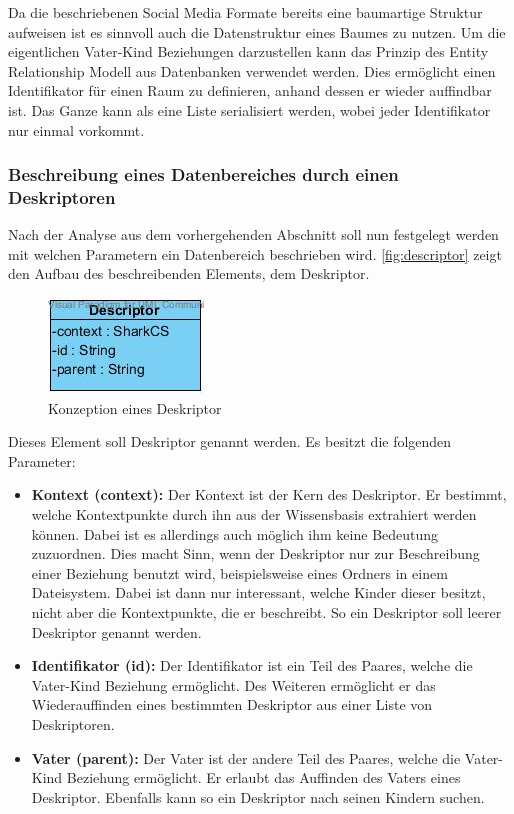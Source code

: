 \documentclass[a4paper]{article}
\begin{document}
	Da die beschriebenen Social Media Formate bereits eine baumartige Struktur
	aufweisen ist es sinnvoll auch die Datenstruktur eines Baumes zu nutzen. Um
	die eigentlichen Vater-Kind Beziehungen darzustellen kann das Prinzip des
	Entity Relationship Modell aus Datenbanken verwendet werden. Dies ermöglicht
	einen Identifikator für einen Raum zu definieren, anhand dessen er wieder
	auffindbar ist. Das Ganze kann als eine Liste serialisiert werden, wobei
	jeder Identifikator nur einmal vorkommt.
	
	\subsubsection{Beschreibung eines Datenbereiches durch einen Deskriptoren}
	\label{sec:desk}
	
	Nach der Analyse aus dem vorhergehenden Abschnitt soll nun festgelegt werden
	mit welchen Parametern ein Datenbereich beschrieben wird.
	\autoref{fig:descriptor} zeigt den Aufbau des beschreibenden Elements, dem
	Deskriptor.
	
	\begin{figure}[H] 
		\centerline{
			\includegraphics{../Bilder/descriptor.jpg}
		}
		\caption{Konzeption eines Deskriptor}
		\label{fig:descriptor}
	\end{figure}
	
	Dieses Element soll Deskriptor genannt werden. Es besitzt die folgenden
	Parameter:
	
	\begin{itemize}
		\item \textbf{Kontext (context):} Der Kontext ist der Kern des Deskriptor.
		Er bestimmt, welche Kontextpunkte durch ihn aus der Wissensbasis extrahiert
		werden können. Dabei ist es allerdings auch möglich ihm keine Bedeutung 
		zuzuordnen. Dies macht Sinn, wenn der Deskriptor nur zur Beschreibung einer
		Beziehung benutzt wird, beispielsweise eines Ordners in einem Dateisystem.
		Dabei ist dann nur interessant, welche Kinder dieser besitzt, nicht aber
		die Kontextpunkte, die er beschreibt. So ein Deskriptor soll leerer
		Deskriptor genannt werden.
		\item \textbf{Identifikator (id):} Der Identifikator ist ein Teil des
		Paares, welche die Vater-Kind Beziehung ermöglicht. Des Weiteren
		ermöglicht er das Wiederauffinden eines bestimmten Deskriptor aus einer
		Liste von Deskriptoren.
		\item \textbf{Vater (parent):} Der Vater ist der andere Teil des Paares,
		welche die Vater-Kind Beziehung ermöglicht. Er erlaubt das Auffinden des
		Vaters eines Deskriptor. Ebenfalls kann so ein Deskriptor nach seinen
		Kindern	suchen.
	\end{itemize} 	
	
\end{document}
